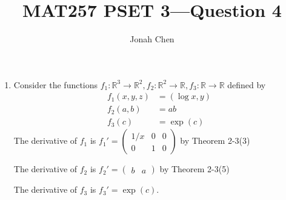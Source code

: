 \documentclass{exam}
\title{MAT257 PSET 3---Question 4}
\author{Jonah Chen}
\numberwithin{equation}{section}
\newcommand{\R}{\mathbb{R}}
\begin{document}
    \sffamily
    \maketitle
    \begin{enumerate}[label=(\alph*)]
        \item Consider the functions $f_1:\R^3\to\R^2, f_2:\R^2\to\R, f_3:\R\to\R$ defined by
        \begin{align*}
            f_1(x,y,z)&=(\log x , y)
            \\
            f_2(a,b)&=ab\\
            f_3(c)&=\exp(c)
        \end{align*}
        The derivative of $f_1$ is $f_1'=\begin{pmatrix}
            1/x & 0 & 0\\
            0 & 1 & 0
        \end{pmatrix}$ by Theorem 2-3(3)

        The derivative of $f_2$ is $f_2'=\begin{pmatrix}
            b & a
        \end{pmatrix}$ by Theorem 2-3(5)

        The derivative of $f_3$ is $f_3'=\exp(c)$.
        

\end{enumerate}
\end{document}
